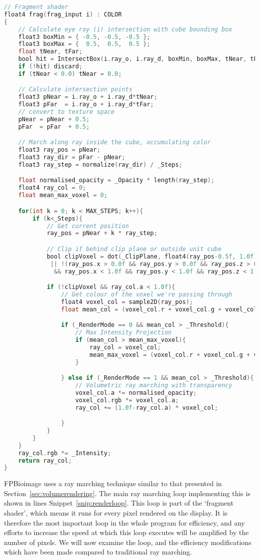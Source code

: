 \begin{lstlisting}[language=C,caption={Fragment shader code for volumetric ray marching},label={snip:renderloop},frame=single]
// Fragment shader
float4 frag(frag_input i) : COLOR
{
	// Calculate eye ray (i) intersection with cube bounding box
	float3 boxMin = { -0.5, -0.5, -0.5 };
	float3 boxMax = {  0.5,  0.5,  0.5 };
	float tNear, tFar;
	bool hit = IntersectBox(i.ray_o, i.ray_d, boxMin, boxMax, tNear, tFar);
	if (!hit) discard;
	if (tNear < 0.0) tNear = 0.0;

	// Calculate intersection points
	float3 pNear = i.ray_o + i.ray_d*tNear;
	float3 pFar  = i.ray_o + i.ray_d*tFar;
	// convert to texture space
	pNear = pNear + 0.5;
	pFar  = pFar  + 0.5;

	// March along ray inside the cube, accumulating color
	float3 ray_pos = pNear;
	float3 ray_dir = pFar - pNear;
	float3 ray_step = normalize(ray_dir) / _Steps;

	float normalised_opacity = _Opacity * length(ray_step);
	float4 ray_col = 0;
	float mean_max_voxel = 0;

	for(int k = 0; k < MAX_STEPS; k++){
		if (k<_Steps){
			// Get current position
			ray_pos = pNear + k * ray_step;

			// Clip if behind clip plane or outside unit cube
			bool clipVoxel = dot(_ClipPlane, float4(ray_pos-0.5f, 1.0f)) > 0.0f
			 || !(ray_pos.x > 0.0f && ray_pos.y > 0.0f && ray_pos.z > 0.0f
			  && ray_pos.x < 1.0f && ray_pos.y < 1.0f && ray_pos.z < 1.0f);

			if (!clipVoxel && ray_col.a < 1.0f){
			  	// Get colour of the voxel we're passing through
		  		float4 voxel_col = sample2D(ray_pos);
			  	float mean_col = (voxel_col.r + voxel_col.g + voxel_col.b);

			  	if (_RenderMode == 0 && mean_col > _Threshold){
			  		// Max Intensity Projection
		  			if (mean_col > mean_max_voxel){
		  				ray_col = voxel_col;
		  				mean_max_voxel = (voxel_col.r + voxel_col.g + voxel_col.b);
		  			}

			  	} else if (_RenderMode == 1 && mean_col > _Threshold){
					// Volumetric ray marching with transparency
					voxel_col.a *= normalised_opacity;
					voxel_col.rgb *= voxel_col.a;
					ray_col += (1.0f-ray_col.a) * voxel_col;

				}
			}
		}
	}
	ray_col.rgb *= _Intensity;
    return ray_col;
}
\end{lstlisting}

FPBioimage uses a ray marching technique similar to that presented in Section~\ref{sec:volumerendering}.
The main ray marching loop implementing this is shown in lines Snippet~\ref{snip:renderloop}.
This loop is part of the `fragment shader', which means it runs for every pixel rendered on the display.
It is therefore the most important loop in the whole program for efficiency, and any efforts to increase the speed at which this loop executes will be amplified by the number of pixels.
We will now examine the loop, and the efficiency modifications which have been made compared to traditional ray marching.


